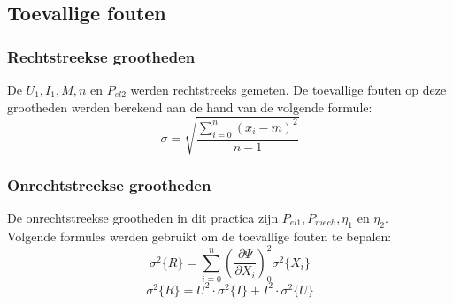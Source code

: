 \subsection{Toevallige fouten}
\subsubsection{Rechtstreekse grootheden}
De $U_1,I_1,M,n$ en $P_{el2}$ werden rechtstreeks gemeten. De toevallige fouten
op deze grootheden werden berekend aan de hand van de volgende formule: 
\begin{equation}
    \sigma=\sqrt{\frac{\sum\limits_{i=0}^n(x_i-m)^2}{n-1}}  
\end{equation}

\subsubsection{Onrechtstreekse grootheden}
De onrechtstreekse grootheden in dit practica zijn $P_{el1},P_{mech},\eta_{1}$ en
$\eta_2$.\\
Volgende formules werden gebruikt om de toevallige fouten te bepalen:\\
\begin{equation}
    \sigma^2\{R\}=\sum\limits_{i=0}^n\left(\frac{\partial \Psi}{\partial X_i}\right)_0^2 \sigma ^2 \{X_i\}
\end{equation}
\begin{equation*}
    \sigma^2\{R\}=U^2 \cdot \sigma ^2 \{I\} + I^2 \cdot \sigma ^2 \{U\}
\end{equation*}


